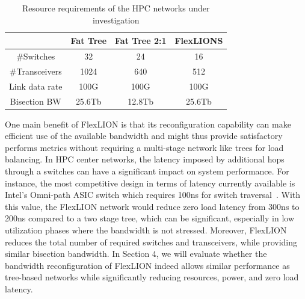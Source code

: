 \begin{table}[]
\caption{Resource requirements of the HPC networks under investigation}
\label{tab:properties}
\centering
\begin{tabular}{@{}c|ccc@{}}
\toprule
                  & Fat Tree & Fat Tree 2:1 & FlexLIONS \\ \midrule
\#Switches     & 32       & 24           & 16        \\
\#Transceivers & 1024     & 640          & 512       \\
Link data rate & 100G     & 100G         & 100G      \\
Bisection BW   & 25.6Tb   & 12.8Tb       & 25.6Tb   \\ \bottomrule
\end{tabular}
\end{table}
One main benefit of FlexLION is that its reconfiguration capability can make efficient use of the available bandwidth and might thus provide satisfactory performs metrics without requiring a multi-stage network like trees for load balancing. In HPC center networks, the latency imposed by additional hops through a switches can have a significant impact on system performance. For instance, the most competitive design in terms of latency currently available is Intel's Omni-path ASIC switch which requires 100ns for switch traversal~\cite{intelomnipath}. With this value, the FlexLION network would reduce zero load latency from 300ns to 200ns compared to a two stage tree, which can be significant, especially in low utilization phases where the bandwidth is not stressed. Moreover, FlexLION reduces the total number of required switches and transceivers, while providing similar bisection bandwidth. In  Section 4, we will evaluate whether the bandwidth reconfiguration of FlexLION indeed allows similar performance as tree-based networks while significantly reducing resources, power, and zero load latency. 

